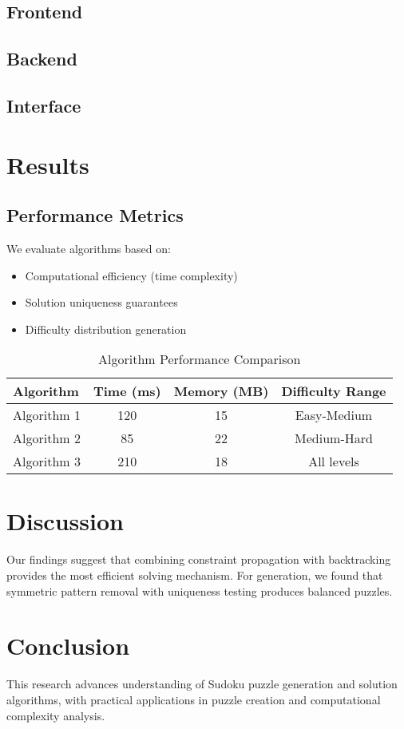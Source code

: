 \documentclass[12pt,a4paper]{article}
\begin{document}
\subsection{Frontend}
\subsection{Backend}
\subsection{Interface}

\section{Results}
\subsection{Performance Metrics}
We evaluate algorithms based on:
\begin{itemize}
    \item Computational efficiency (time complexity)
    \item Solution uniqueness guarantees
    \item Difficulty distribution generation
\end{itemize}

\begin{table}[h]
\centering
\caption{Algorithm Performance Comparison}
\begin{tabular}{lccc}
\toprule
Algorithm & Time (ms) & Memory (MB) & Difficulty Range \\
\midrule
Algorithm 1 & 120 & 15 & Easy-Medium \\
Algorithm 2 & 85 & 22 & Medium-Hard \\
Algorithm 3 & 210 & 18 & All levels \\
\bottomrule
\end{tabular}
\end{table}

\section{Discussion}
Our findings suggest that combining constraint propagation with backtracking provides the most efficient solving mechanism. For generation, we found that symmetric pattern removal with uniqueness testing produces balanced puzzles.

\section{Conclusion}
This research advances understanding of Sudoku puzzle generation and solution algorithms, with practical applications in puzzle creation and computational complexity analysis.



\end{document}

